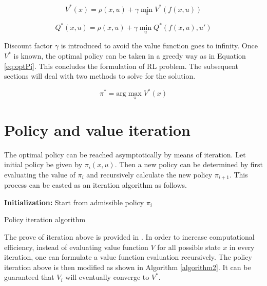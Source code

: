 \begin{equation}
V^*(x) = \rho(x,u) + \gamma \min_{u} V^*(f(x,u))
\label{eq:bellman}
\end{equation}

\begin{equation}
Q^*(x,u) = \rho(x,u) + \gamma \min_{u} Q^*(f(x,u),u')
\label{eq:bellman2}
\end{equation}

Discount factor $\gamma$ is introduced to avoid the value function goes to infinity. Once $V^*$ is known, the optimal policy can be taken in a greedy way as in Equation \ref{eq:optPi}. This concludes the formulation of \ac{RL} problem. The subsequent sections will deal with two methods to solve for the solution.

\begin{equation}
\pi^* = \text{arg} \max_{\pi} V^*(x)
\label{eq:optPi}
\end{equation}

\section{Policy and value iteration} \label{sec:value_iter}
The optimal policy can be reached asymptotically by means of iteration. Let initial policy be given by $ \pi_i(x,u) $. Then a new policy can be determined by first evaluating the value of $ \pi_i $ and recursively calculate the new policy $ \pi_{i+1} $. This process can be casted as an iteration algorithm as follows.

\begin{algorithm}[H]
	\textbf{Initialization:} Start from admissible policy $ \pi_{i} $\\
\caption{Policy iteration algorithm}
\end{algorithm}

The prove of iteration above is provided in \cite{Bertsekas}. In order to increase computational efficiency, instead of evaluating value function $V$ for all possible state $x$ in every iteration, one can formulate a value function evaluation recursively. The policy iteration above is then modified as shown in Algorithm \ref{algorithm2}. It can be guaranteed that $V_i$ will eventually converge to $V^*$.

